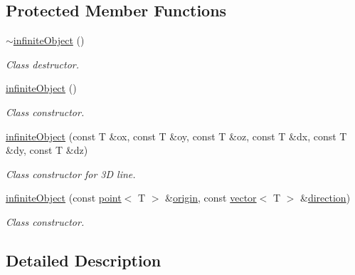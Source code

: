 \subsection*{Protected Member Functions}
\begin{DoxyCompactItemize}
\item 
\mbox{\label{classddd_1_1infinite_object_a11cdc4c593382d08b52554d2b39d4e51}} 
\hyperlink{classddd_1_1infinite_object_a11cdc4c593382d08b52554d2b39d4e51}{$\sim$infinite\+Object} ()
\begin{DoxyCompactList}\small\item\em Class destructor. \end{DoxyCompactList}\item 
\mbox{\label{classddd_1_1infinite_object_ab8d5554eefde47d6c9c9964ad5b68cae}} 
\hyperlink{classddd_1_1infinite_object_ab8d5554eefde47d6c9c9964ad5b68cae}{infinite\+Object} ()
\begin{DoxyCompactList}\small\item\em Class constructor. \end{DoxyCompactList}\item 
\mbox{\label{classddd_1_1infinite_object_a293acb7dcbdc21327a1fd465aee2fa88}} 
\hyperlink{classddd_1_1infinite_object_a293acb7dcbdc21327a1fd465aee2fa88}{infinite\+Object} (const T \&ox, const T \&oy, const T \&oz, const T \&dx, const T \&dy, const T \&dz)
\begin{DoxyCompactList}\small\item\em Class constructor for 3D line. \end{DoxyCompactList}\item 
\hyperlink{classddd_1_1infinite_object_aabf47275ecc4d586e9fd95102acee26c}{infinite\+Object} (const \hyperlink{classddd_1_1point}{point}$<$ T $>$ \&\hyperlink{classddd_1_1infinite_object_a0097f1df7ea358d410a73bdfcf2904f9}{origin}, const \hyperlink{classddd_1_1vector}{vector}$<$ T $>$ \&\hyperlink{classddd_1_1infinite_object_a7197d400db3804be122c78475c242a00}{direction})
\begin{DoxyCompactList}\small\item\em Class constructor. \end{DoxyCompactList}\end{DoxyCompactItemize}


\subsection{Detailed Description}
